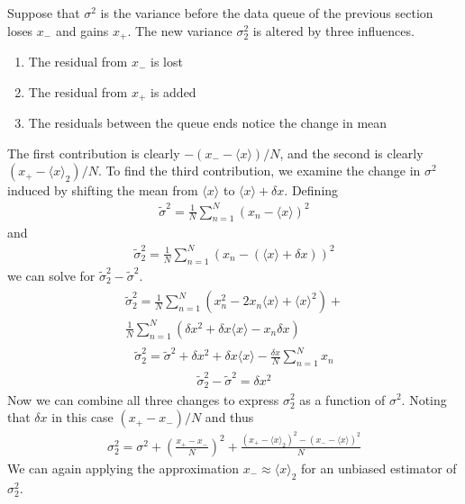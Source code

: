 \documentclass[conference]{IEEEtran}
\begin{document}
Suppose that $\sigma^{2}$ is the variance before the data queue of the previous section loses $x_{-}$ and gains $x_{+}$. The new variance $\sigma_{2}^{2}$ is altered by three influences.
\begin{enumerate}
\item{The residual from $x_{-}$ is lost}
\item{The residual from $x_{+}$ is added}
\item{The residuals between the queue ends notice the change in mean}
\end{enumerate}
The first contribution is clearly $-(x_{-} - \langle x \rangle)/N$, and the second is clearly $(x_{+} - \langle x \rangle_{2})/N$. To find the third contribution, we examine the change in $\sigma^{2}$ induced by shifting the mean from $\langle x \rangle$ to $\langle x \rangle + \delta x$. Defining
\begin{align}
\widetilde{\sigma}^{2} = \frac{1}{N}\sum_{n=1}^{N}(x_{n} - \langle x \rangle)^{2}
\end{align}
and
\begin{align}
\widetilde{\sigma}^{2}_{2} = \frac{1}{N}\sum_{n=1}^{N}(x_{n} - (\langle x \rangle + \delta x))^{2}
\end{align}
we can solve for $\widetilde{\sigma}_{2}^{2} - \widetilde{\sigma}^{2}$.
\begin{align}
\begin{split}
\widetilde{\sigma}^{2}_{2} = \frac{1}{N}\sum_{n=1}^{N}\left(x_{n}^{2} - 2x_{n}\langle x \rangle + \langle x \rangle^{2}\right) + \\ \frac{1}{N}\sum_{n=1}^{N}\left(\delta x^{2} + \delta x \langle x \rangle - x_{n}\delta x\right)
\end{split}
\end{align}
\begin{align}
\widetilde{\sigma}^{2}_{2}=\widetilde{\sigma}^{2} + \delta x^{2} + \delta x \langle x \rangle - \frac{\delta x}{N}\sum_{n=1}^{N}x_{n}
\end{align}
\begin{align}
\widetilde{\sigma}^{2}_{2} - \widetilde{\sigma}^{2} = \delta x^{2}\tag{2}
\end{align}
Now we can combine all three changes to express $\sigma_{2}^{2}$ as a function of $\sigma^{2}$. Noting that $\delta x$ in this case $(x_{+} - x_{-})/N$ and thus
\begin{align}
\sigma^{2}_{2} = \sigma^{2} + \left(\frac{x_{+} - x_{-}}{N}\right)^{2} + \frac{(x_{+} - \langle x \rangle_{2})^{2} - (x_{-} - \langle x \rangle)^{2}}{N}
\end{align}
We can again applying the approximation $x_{-} \approx \langle x \rangle_{2}$ for an unbiased estimator of $\sigma_{2}^{2}$.
\end{document}
